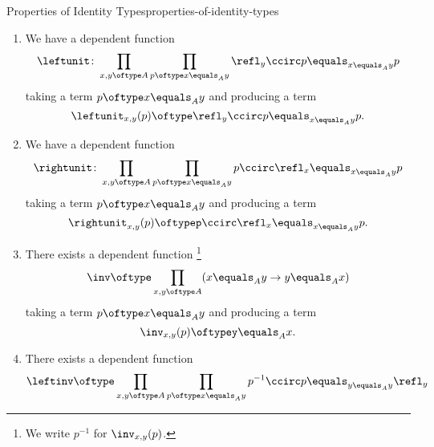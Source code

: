 \begin{proposition}{Properties of Identity Types}{properties-of-identity-types}
\begin{enumerate}
            \[
                \assoc_{w,x,y,z}(r,q,p)%
                \oftype%
                (r\ccirc q)\ccirc p%
                \equals_{w\equals_{a}z}%
                r\ccirc(q\ccirc p).%
            \]%
        \item\label{properties-of-identity-types-left-unitality}We have a dependent function
            \[
                \leftunit%
                \colon%
                \prod_{x,y\oftype A}\prod_{p\oftype x\equals_{A}y}\refl_{y}\ccirc p\equals_{x\equals_{A}y}p%
            \]%
            taking a term $p\oftype x\equals_{A}y$ and producing a term
            \[
                \leftunit_{x,y}(p)%
                \oftype%
                \refl_{y}\ccirc p%
                \equals_{x\equals_{A}y}%
                p.%
            \]
        \item\label{properties-of-identity-types-right-unitality}We have a dependent function
            \[
                \rightunit%
                \colon%
                \prod_{x,y\oftype A}\prod_{p\oftype x\equals_{A}y}p\ccirc\refl_{x}\equals_{x\equals_{A}y}p%
            \]%
            taking a term $p\oftype x\equals_{A}y$ and producing a term
            \[
                \rightunit_{x,y}(p)%
                \oftype%
                p\ccirc\refl_{x}%
                \equals_{x\equals_{A}y}%
                p.%
            \]
        \item\label{properties-of-identity-types-inversion}There exists a dependent function%
            \footnote{%
                We write $p^{-1}$ for $\inv_{x,y}(p)$.
                \par\vspace*{\TCBBoxCorrection}
            }%
            \[
                \inv%
                \oftype%
                \prod_{x,y\oftype A}(x\equals_{A}y\to y\equals_{A}x)%
            \]%
            taking a term $p\oftype x\equals_{A}y$ and producing a term
            \[
                \inv_{x,y}(p)%
                \oftype%
                y\equals_{A}x.%
            \]%
        \item\label{properties-of-identity-types-left-invertibility}There exists a dependent function
            \[
                \leftinv%
                \oftype%
                \prod_{x,y\oftype A}\prod_{p\oftype x\equals_{A}y}p^{-1}\ccirc p\equals_{y\equals_{A}y}\refl_{y}
\]
\end{enumerate}
\end{proposition}
